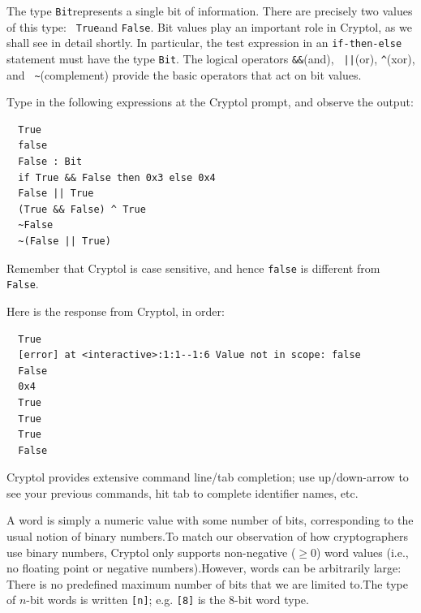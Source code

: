 
The type {\tt Bit}\indTheBitType represents a single bit of
information. There are precisely two values of this type: {\tt
  True}\indTrue and {\tt False}\indFalse. Bit values play an important
role in Cryptol, as we shall see in detail shortly. In particular, the
test expression in an {\tt if-then-else} statement must have the type
{\tt Bit}.  The logical operators {\tt \&\&}\indAnd (and), {\tt
  ||}\indOr (or), {\tt \Verb|^|}\indXOr (xor), and {\tt
  \Verb|~|}\indComplement (complement) provide the basic operators
that act on bit values.

\begin{Exercise}\label{ex:dataBit}
  Type in the following expressions at the Cryptol prompt, and observe
  the output:
\begin{Verbatim}
  True
  false
  False : Bit
  if True && False then 0x3 else 0x4
  False || True
  (True && False) ^ True
  ~False
  ~(False || True)
\end{Verbatim}
Remember that Cryptol is case sensitive, and hence {\tt false} is
different from {\tt False}.\indCaseSensitive
\end{Exercise}
\begin{Answer}
Here is the response from Cryptol, in order:
\begin{small}
\begin{Verbatim}
  True
  [error] at <interactive>:1:1--1:6 Value not in scope: false
  False
  0x4
  True
  True
  True
  False
\end{Verbatim}
\end{small}
\end{Answer}

\begin{tip}
  Cryptol provides extensive command line/tab completion; use
  up/down-arrow to see your previous commands, hit tab to complete
  identifier names, etc.
\end{tip}


A word is simply a numeric value with some number of bits,
corresponding to the usual notion of binary numbers.\indTheWordType To
match our observation of how cryptographers use binary numbers,
Cryptol only supports non-negative ($\geq 0$) word values (i.e., no
floating point or negative numbers).\indFloatingPoint However, words
can be arbitrarily large: There is no predefined maximum number of
bits that we are limited to.\indArbitraryPrecision The type of $n$-bit
words is written \texttt{[n]}; e.g. \texttt{[8]} is the 8-bit word type.

